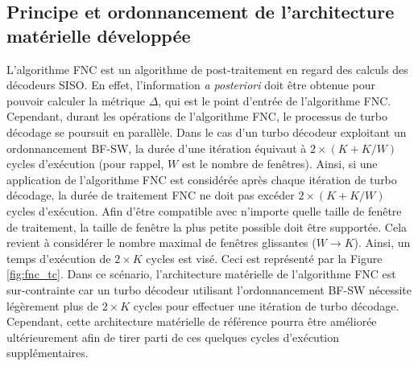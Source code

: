 \subsection{Principe et ordonnancement de l'architecture matérielle développée}
L'algorithme FNC est un algorithme de post-traitement en regard des calculs des décodeurs SISO. En effet, l'information 
\textit{a posteriori} doit être obtenue pour pouvoir calculer la métrique $\Delta$, qui est le point d'entrée de l'algorithme FNC. Cependant, durant les 
opérations de l'algorithme FNC, le processus de turbo décodage se poursuit en parallèle. 
Dans le cas d'un turbo décodeur exploitant un ordonnancement BF-SW, la durée d'une itération équivaut à  $2\times (K+K/W)$ cycles d’exécution
(pour rappel, $W$ est le nombre de fenêtres). 
Ainsi, si une application de l'algorithme FNC est considérée après chaque itération de turbo décodage, la
durée de traitement FNC ne doit pas excéder  $2\times (K+K/W)$ cycles d’exécution.
Afin d'être compatible avec n'importe quelle taille de 
fenêtre de traitement, la taille de fenêtre la plus petite possible doit être supportée. Cela revient à considérer le nombre 
maximal de fenêtres glissantes  ($W\rightarrow K$). Ainsi, un temps d'exécution de $2\times K$ cycles est visé.
Ceci est 
représenté par la Figure \ref{fig:fnc_tc}. Dans ce scénario, l'architecture matérielle de l'algorithme FNC est sur-contrainte 
car un turbo décodeur utilisant l'ordonnancement BF-SW nécessite légèrement plus de $2\times K$ cycles pour 
effectuer une itération de turbo décodage. Cependant, cette architecture matérielle de référence pourra 
être améliorée ultérieurement afin de tirer parti de ces quelques cycles d'exécution supplémentaires. 

